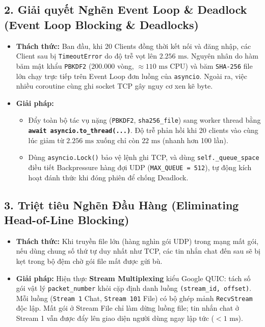 \subsection{2. Giải quyết Nghẽn Event Loop \& Deadlock (Event Loop Blocking \& Deadlocks)}
\begin{itemize}
    \item \textbf{Thách thức:} Ban đầu, khi 20 Clients đồng thời kết nối và đăng nhập, các Client sau bị \texttt{TimeoutError} do độ trễ vọt lên $2.256\text{ ms}$. Nguyên nhân do hàm băm mật khẩu \texttt{PBKDF2} ($200.000$ vòng, $\approx 110\text{ ms}$ CPU) và băm \texttt{SHA-256} file lớn chạy trực tiếp trên Event Loop đơn luồng của \texttt{asyncio}. Ngoài ra, việc nhiều coroutine cùng ghi socket TCP gây nguy cơ xen kẽ byte.
    \item \textbf{Giải pháp:} 
    \begin{itemize}
        \item Đẩy toàn bộ tác vụ nặng (\texttt{PBKDF2}, \texttt{sha256\_file}) sang worker thread bằng \textbf{\texttt{await asyncio.to\_thread(...)}}. Độ trễ phản hồi khi 20 clients vào cùng lúc giảm từ $2.256\text{ ms}$ xuống chỉ còn \textbf{$22\text{ ms}$} (nhanh hơn 100 lần).
        \item Dùng \texttt{asyncio.Lock()} bảo vệ lệnh ghi TCP, và dùng \texttt{self.\_queue\_space} điều tiết Backpressure hàng đợi UDP (\texttt{MAX\_QUEUE = 512}), tự động kích hoạt đánh thức khi đóng phiên để chống Deadlock.
    \end{itemize}
\end{itemize}

\subsection{3. Triệt tiêu Nghẽn Đầu Hàng (Eliminating Head-of-Line Blocking)}
\begin{itemize}
    \item \textbf{Thách thức:} Khi truyền file lớn (hàng nghìn gói UDP) trong mạng mất gói, nếu dùng chung số thứ tự duy nhất như TCP, các tin nhắn chat đến sau sẽ bị kẹt trong bộ đệm chờ gói file mất được gửi bù.
    \item \textbf{Giải pháp:} Hiện thực \textbf{Stream Multiplexing} kiểu Google QUIC: tách số gói vật lý \texttt{packet\_number} khỏi cặp định danh luồng \texttt{(stream\_id, offset)}. Mỗi luồng (\texttt{Stream 1} Chat, \texttt{Stream 101} File) có bộ ghép mảnh \texttt{RecvStream} độc lập. Mất gói ở Stream File chỉ làm dừng luồng file; tin nhắn chat ở Stream 1 vẫn được đẩy lên giao diện người dùng ngay lập tức ($< 1\text{ ms}$).
\end{itemize}

